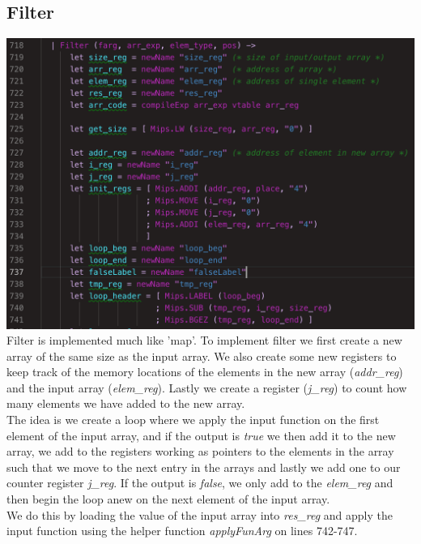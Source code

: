 \subsection{Filter}
\includegraphics[width=\linewidth]{Materials/CodeGen/filterIntro}
Filter is implemented much like 'map'. To implement filter we first create a new array of the same size as the input array. We also create some new registers to keep track of the memory locations of the elements in the new array (\textit{addr\_reg}) and the input array (\textit{elem\_reg}). Lastly we create a register (\textit{j\_reg}) to count how many elements we have added to the new array.\\
The idea is we create a loop where we apply the input function on the first element of the input array, and if the output is \textit{true} we then add it to the new array, we add to the registers working as pointers to the elements in the array such that we move to the next entry in the arrays and lastly we add one to our counter register \textit{j\_reg}. If the output is \textit{false}, we only add to the \textit{elem\_reg} and then begin the loop anew on the next element of the input array.\\
We do this by loading the value of the input array into \textit{res\_reg} and apply the input function using the helper function \textit{applyFunArg} on lines 742-747.
 
